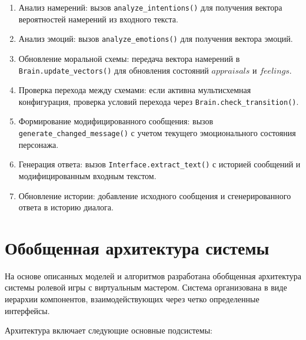 \begin{enumerate}
	\item Анализ намерений: вызов \texttt{analyze\_intentions()} для получения вектора вероятностей намерений из входного текста.
	
	\item Анализ эмоций: вызов \texttt{analyze\_emotions()} для получения вектора эмоций.
	
	\item Обновление моральной схемы: передача вектора намерений в \texttt{Brain.update\_vectors()} для обновления состояний $appraisals$ и $feelings$.
	
	\item Проверка перехода между схемами: если активна мультисхемная конфигурация, проверка условий перехода через \texttt{Brain.check\_transition()}.
	
	\item Формирование модифицированного сообщения: вызов \texttt{generate\_changed\_message()} с учетом текущего эмоционального состояния персонажа.
	
	\item Генерация ответа: вызов \texttt{Interface.extract\_text()} с историей сообщений и модифицированным входным текстом.
	
	\item Обновление истории: добавление исходного сообщения и сгенерированного ответа в историю диалога.
\end{enumerate}





\section{Обобщенная архитектура системы}

На основе описанных моделей и алгоритмов разработана обобщенная архитектура системы ролевой игры с виртуальным мастером. Система организована в виде иерархии компонентов, взаимодействующих через четко определенные интерфейсы.

Архитектура включает следующие основные подсистемы:

